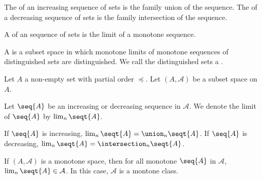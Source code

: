 




The
of an increasing sequence
of sets is the family
union of the sequence.
The
of a decreasing sequence
of sets is the family
intersection of the sequence.

A
of an sequence of sets
is the limit of a
monotone sequence.

A
is a
subset space in which
monotone limits of
 monotone sequences
of distinguished sets are distinguished.
We call the distinguished sets a
.


Let $A$ a non-empty set with
partial order $\preceq$.
Let $(A, \mathcal{A})$ be a
subset space on $A$.

Let $\seq{A}$ be an increasing
or decreasing sequence in $\mathcal{A}$.
We denote the limit of $\seq{A}$
by $\lim_{n} \seqt{A}$.

If $\seq{A}$ is increasing,
$\lim_n \seqt{A} = \union_{n} \seqt{A}$.
If $\seq{A}$ is decreasing,
$\lim_n \seqt{A} = \intersection_{n} \seqt{A}$.

If $(A, \mathcal{A})$ is a monotone space,
then for all monotone
$\seq{A}$ in $\mathcal{A}$,
$\lim_{n} \seqt{A} \in \mathcal{A}$.
In this case, $\mathcal{A}$ is a montone class.
